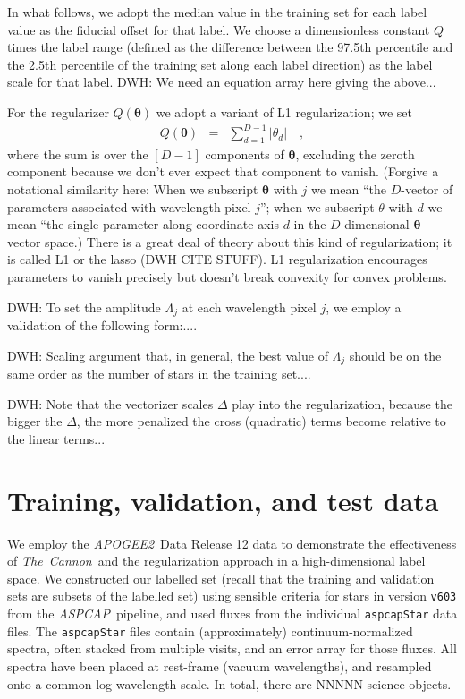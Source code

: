 \documentclass[12pt,preprint]{aastex}
\newcommand{\project}[1]{\textsl{#1}}
\newcommand{\TheCannon}{\project{The~Cannon}}
\newcommand{\acronym}[1]{{\small{#1}}}
\newcommand{\apogee}{\project{\acronym{APOGEE2}}}
\newcommand{\aspcap}{\project{\acronym{ASPCAP}}}
\newcommand{\Dvector}[1]{\boldsymbol{#1}}
\newcommand{\vectheta}{\Dvector{\theta}}
\begin{document}
In what follows, we adopt the median value in the training set for
each label value as the fiducial offset for that label.
We choose a dimensionless constant $Q$ times the label range (defined
as the difference between the 97.5th percentile and the 2.5th
percentile of the training set along each label direction) as the
label scale for that label.
DWH: We need an equation array here giving the above...

For the regularizer $Q(\vectheta)$ we adopt a variant of L1
regularization; we set
\begin{eqnarray}
  Q(\vectheta) &=& \sum_{d=1}^{D-1} |\theta_d|
  \quad,
\end{eqnarray}
where the sum is over the $[D-1]$ components of $\vectheta$, excluding
the zeroth component because we don't ever expect that component to
vanish.
(Forgive a notational similarity here: When we subscript $\vectheta$ with
$j$ we mean ``the $D$-vector of parameters associated with wavelength
pixel $j$''; when we subscript $\theta$ with $d$ we mean ``the single
parameter along coordinate axis $d$ in the $D$-dimensional $\vectheta$
vector space.)
There is a great deal of theory about this kind of regularization; it
is called L1 or the lasso (DWH CITE STUFF).
L1 regularization encourages parameters to vanish precisely but
doesn't break convexity for convex problems.

DWH: To set the amplitude $\Lambda_j$ at each wavelength pixel $j$, we
employ a validation of the following form:....

DWH: Scaling argument that, in general, the best value of $\Lambda_j$
should be on the same order as the number of stars in the training
set....

DWH: Note that the vectorizer scales $\Delta$ play into the
regularization, because the bigger the $\Delta$, the more penalized
the cross (quadratic) terms become relative to the linear terms...

\section{Training, validation, and test data}

We employ the \apogee\ Data Release 12 data to demonstrate the effectiveness
of \TheCannon\ and the regularization approach in a high-dimensional label space.
We constructed our labelled set (recall that the training and validation sets are subsets of the labelled set) using sensible criteria for  
stars in version \texttt{v603} from the \aspcap\ 
pipeline, and used fluxes from the individual \texttt{aspcapStar} data files.
The \texttt{aspcapStar} files contain (approximately) continuum-normalized 
spectra, often stacked from multiple visits, and an error array for those 
fluxes.  All spectra have been placed at rest-frame (vacuum wavelengths), and
resampled onto a common log-wavelength scale. In total, there are NNNNN science
objects.
\end{document}
